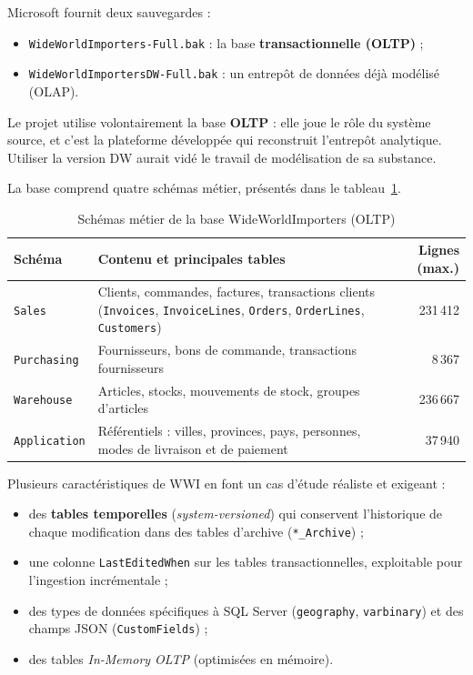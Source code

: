 Microsoft fournit deux sauvegardes :
\begin{itemize}
  \item \texttt{WideWorldImporters-Full.bak} : la base \textbf{transactionnelle (OLTP)} ;
  \item \texttt{WideWorldImportersDW-Full.bak} : un entrepôt de données déjà modélisé (OLAP).
\end{itemize}

Le projet utilise volontairement la base \textbf{OLTP} : elle joue le rôle du système source, et c'est
la plateforme développée qui reconstruit l'entrepôt analytique. Utiliser la version DW aurait vidé le
travail de modélisation de sa substance.

La base comprend quatre schémas métier, présentés dans le tableau~\ref{tab:wwi-schemas}.

\begin{table}[H]
\centering
\caption{Schémas métier de la base WideWorldImporters (OLTP)}
\label{tab:wwi-schemas}
\begin{tabularx}{\linewidth}{@{}l X r@{}}
\toprule
\textbf{Schéma} & \textbf{Contenu et principales tables} & \textbf{Lignes (max.)} \\
\midrule
\texttt{Sales} & Clients, commandes, factures, transactions clients (\texttt{Invoices},
  \texttt{InvoiceLines}, \texttt{Orders}, \texttt{OrderLines}, \texttt{Customers}) & 231\,412 \\
\texttt{Purchasing} & Fournisseurs, bons de commande, transactions fournisseurs & 8\,367 \\
\texttt{Warehouse} & Articles, stocks, mouvements de stock, groupes d'articles & 236\,667 \\
\texttt{Application} & Référentiels : villes, provinces, pays, personnes, modes de livraison et de
  paiement & 37\,940 \\
\bottomrule
\end{tabularx}
\end{table}

Plusieurs caractéristiques de WWI en font un cas d'étude réaliste et exigeant :
\begin{itemize}
  \item des \textbf{tables temporelles} (\emph{system-versioned}) qui conservent l'historique de chaque
        modification dans des tables d'archive (\texttt{*\_Archive}) ;
  \item une colonne \texttt{LastEditedWhen} sur les tables transactionnelles, exploitable pour
        l'ingestion incrémentale ;
  \item des types de données spécifiques à SQL Server (\texttt{geography}, \texttt{varbinary}) et des
        champs JSON (\texttt{CustomFields}) ;
  \item des tables \emph{In-Memory OLTP} (optimisées en mémoire).
\end{itemize}

